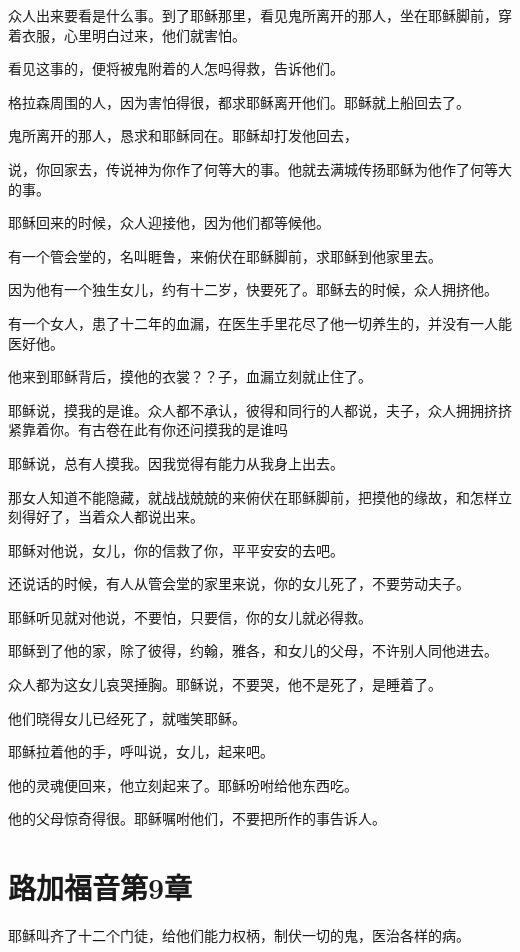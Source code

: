 \documentclass[12pt,oneside]{book}
\begin{document}
众人出来要看是什么事。到了耶稣那里，看见鬼所离开的那人，坐在耶稣脚前，穿着衣服，心里明白过来，他们就害怕。

看见这事的，便将被鬼附着的人怎吗得救，告诉他们。

格拉森周围的人，因为害怕得很，都求耶稣离开他们。耶稣就上船回去了。

鬼所离开的那人，恳求和耶稣同在。耶稣却打发他回去，

说，你回家去，传说神为你作了何等大的事。他就去满城传扬耶稣为他作了何等大的事。

耶稣回来的时候，众人迎接他，因为他们都等候他。

有一个管会堂的，名叫睚鲁，来俯伏在耶稣脚前，求耶稣到他家里去。

因为他有一个独生女儿，约有十二岁，快要死了。耶稣去的时候，众人拥挤他。

有一个女人，患了十二年的血漏，在医生手里花尽了他一切养生的，并没有一人能医好他。

他来到耶稣背后，摸他的衣裳？？子，血漏立刻就止住了。

耶稣说，摸我的是谁。众人都不承认，彼得和同行的人都说，夫子，众人拥拥挤挤紧靠着你。有古卷在此有你还问摸我的是谁吗

耶稣说，总有人摸我。因我觉得有能力从我身上出去。

那女人知道不能隐藏，就战战兢兢的来俯伏在耶稣脚前，把摸他的缘故，和怎样立刻得好了，当着众人都说出来。

耶稣对他说，女儿，你的信救了你，平平安安的去吧。

还说话的时候，有人从管会堂的家里来说，你的女儿死了，不要劳动夫子。

耶稣听见就对他说，不要怕，只要信，你的女儿就必得救。

耶稣到了他的家，除了彼得，约翰，雅各，和女儿的父母，不许别人同他进去。

众人都为这女儿哀哭捶胸。耶稣说，不要哭，他不是死了，是睡着了。

他们晓得女儿已经死了，就嗤笑耶稣。

耶稣拉着他的手，呼叫说，女儿，起来吧。

他的灵魂便回来，他立刻起来了。耶稣吩咐给他东西吃。

他的父母惊奇得很。耶稣嘱咐他们，不要把所作的事告诉人。

\chapter{路加福音第9章}
耶稣叫齐了十二个门徒，给他们能力权柄，制伏一切的鬼，医治各样的病。
\end{document}
